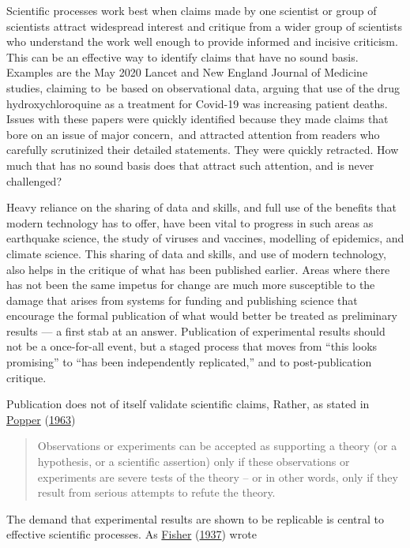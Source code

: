 \documentclass[
  10pt,
  b5paper]{book}
\begin{document}
Scientific processes work best when claims made by one scientist
or group of scientists attract widespread interest and critique
from a wider group of scientists who understand the work well
enough to provide informed and incisive criticism. This can be
an effective way to identify claims that have no sound basis.
Examples are the May 2020 Lancet and New England Journal of
Medicine studies, claiming to~be based on observational data,
arguing that use of the drug hydroxychloroquine as a treatment
for Covid-19 was increasing patient deaths.\\
Issues with these papers were quickly identified because they
made claims that bore on an issue of major concern,~and attracted
attention from readers who carefully scrutinized their detailed
statements. They were quickly retracted. How much that has no
sound basis does that attract such attention, and is never
challenged?

Heavy reliance on the sharing of data and skills, and full use of
the benefits that modern technology has to offer, have been vital
to progress in such areas as earthquake science, the study of
viruses and vaccines, modelling of epidemics, and climate science.
This sharing of data and skills, and use of modern technology, also
helps in the critique of what has been published earlier.
Areas where there has not been the same impetus for change are much
more susceptible to the damage that arises from systems for funding
and publishing science that encourage the formal publication of
what would better be treated as preliminary results --- a first
stab at an answer. Publication of experimental results should not
be a once-for-all event, but a staged process that moves from
``this looks promising'' to ``has been independently replicated,''
and to post-publication critique.

Publication does not of itself validate scientific claims,
Rather, as stated in \protect\hyperlink{ref-popper_1963}{Popper} (\protect\hyperlink{ref-popper_1963}{1963})

\begin{quote}
Observations or experiments can be accepted as supporting a theory (or a hypothesis, or a scientific assertion) only if these observations or experiments are severe tests of the theory -- or in other words, only if they result from serious attempts to refute the theory.
\end{quote}

The demand that experimental results are shown to be replicable is
central to effective scientific processes. As \protect\hyperlink{ref-fisher_1937}{Fisher} (\protect\hyperlink{ref-fisher_1937}{1937}) wrote
\end{document}
